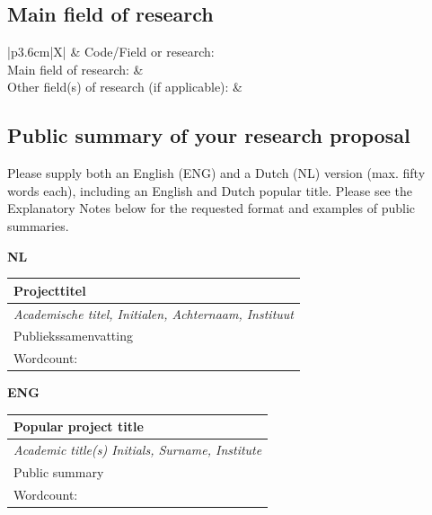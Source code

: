 \documentclass[10pt]{article}
\newcommand{\tableheadfont}{\bfseries\fontsize{10}{10}\selectfont\leavevmode\color{tableblue}}
\begin{document}
	\subsection{Main field of research}
	
	
	\begin{tabularx}{\linewidth}{|p{3.6cm}|X|}
		\hline
		& Code/Field or research: \\\hline
		Main field of research: & \\\hline
		Other field(s) of research (if applicable): & \\\hline
	\end{tabularx}
	
	\subsection{Public summary of your research proposal}
	Please supply both an English (ENG) and a Dutch (NL) version (max. fifty words each), including an English and Dutch popular title. Please see the Explanatory Notes below for the requested format and examples of public summaries. 
	
	{\hspace{2mm}\tableheadfont NL}\\
	\hspace{2mm} \begin{tabularx}{\linewidth}{|X|}
		\hline \textbf{Projecttitel} \\
		\hline {\textit{Academische titel, Initialen, Achternaam, Instituut}} \\
		\hline {Publiekssamenvatting} \\
		\hline {Wordcount:} \\
		\hline
	\end{tabularx}
	
	\vspace{6mm}	
	{\hspace{2mm}\tableheadfont ENG}\\
	\hspace{2mm} \begin{tabularx}{\linewidth}{|X|}
		\hline \textbf{Popular project title} \\
		\hline {\textit{Academic title(s) Initials, Surname, Institute}} \\
		\hline {Public summary} \\
		\hline {Wordcount:} \\
		\hline
	\end{tabularx}	
		
\end{document}

